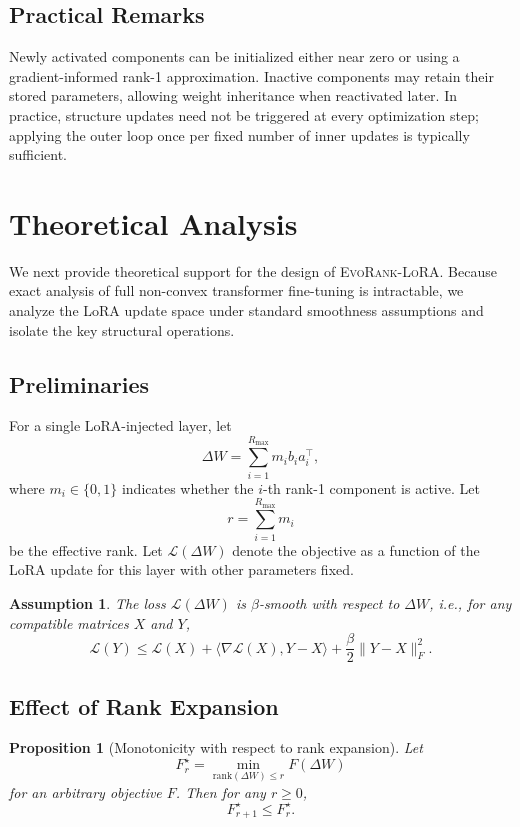 \documentclass{article}
\newtheorem{proposition}{Proposition}[section]
\newtheorem{assumption}{Assumption}
\newcommand{\method}{\textsc{EvoRank-LoRA}}
\newcommand{\Rmax}{R_{\max}}
\begin{document}
\subsection{Practical Remarks}
Newly activated components can be initialized either near zero or using a gradient-informed rank-1 approximation. Inactive components may retain their stored parameters, allowing weight inheritance when reactivated later. In practice, structure updates need not be triggered at every optimization step; applying the outer loop once per fixed number of inner updates is typically sufficient.

\section{Theoretical Analysis}
\label{sec:theory}

We next provide theoretical support for the design of \method. Because exact analysis of full non-convex transformer fine-tuning is intractable, we analyze the LoRA update space under standard smoothness assumptions and isolate the key structural operations.

\subsection{Preliminaries}
For a single LoRA-injected layer, let
\begin{equation}
    \Delta W = \sum_{i=1}^{\Rmax} m_i b_i a_i^\top,
\end{equation}
where $m_i \in \{0,1\}$ indicates whether the $i$-th rank-1 component is active. Let
\begin{equation}
    r = \sum_{i=1}^{\Rmax} m_i
\end{equation}
be the effective rank. Let $\mathcal{L}(\Delta W)$ denote the objective as a function of the LoRA update for this layer with other parameters fixed.

\begin{assumption}
\label{ass:smoothness}
The loss $\mathcal{L}(\Delta W)$ is $\beta$-smooth with respect to $\Delta W$, i.e., for any compatible matrices $X$ and $Y$,
\begin{equation}
\mathcal{L}(Y) \le \mathcal{L}(X) + \langle \nabla \mathcal{L}(X), Y-X \rangle + \frac{\beta}{2}\|Y-X\|_F^2.
\end{equation}
\end{assumption}

\subsection{Effect of Rank Expansion}
\begin{proposition}[Monotonicity with respect to rank expansion]
\label{prop:rank_monotonicity}
Let
\begin{equation}
    F_r^\star = \min_{\mathrm{rank}(\Delta W) \le r} F(\Delta W)
\end{equation}
for an arbitrary objective $F$. Then for any $r \ge 0$,
\begin{equation}
    F_{r+1}^\star \le F_r^\star.
\end{equation}
\end{proposition}
\end{document}

